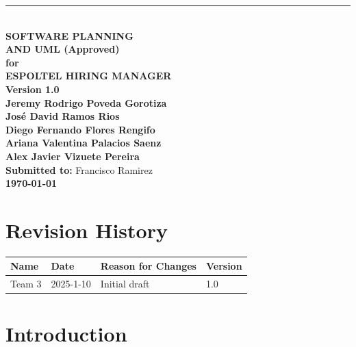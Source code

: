 \documentclass{scrreprt}
\date{November 14, 2024}
\def\myversion{1.0 }
\begin{document}
\begin{titlepage}
    \begin{flushright}
        \rule{16cm}{1.5pt} \\[1cm]
        {\Huge\bfseries SOFTWARE PLANNING\\ AND UML (Approved)}\\[1cm]
        {\LARGE\bfseries for}\\[1cm]
        {\Huge\textbf{ESPOLTEL HIRING MANAGER}}\\[2cm]
        {\Large\textbf{Version \myversion}}\\[1.5cm]
        
        {\Large\textbf{Jeremy Rodrigo Poveda Gorotiza}\\
        \textbf{José David Ramos Rios}\\
        \textbf{Diego Fernando Flores Rengifo}\\
        \textbf{Ariana Valentina Palacios Saenz}\\
        \textbf{Alex Javier Vizuete Pereira}}\\[1.5cm]
        
        {\Large\textbf{Submitted to:} Francisco Ramirez}\\[1.5cm]
        {\Large\textbf{\today}}
    \end{flushright}
    \vfill
\end{titlepage}

\chapter*{Revision History}
\setcounter{page}{1}
\begin{center}
	\begin{tabular}{@{} l l p{6.5cm} l @{}}
		\toprule
		\textbf{Name}    & \textbf{Date}   & \textbf{Reason for Changes} & \textbf{Version} \\ 
		\midrule
		Team 3           & 2025-1-10      & Initial draft               & 1.0              \\
		\bottomrule
	\end{tabular}
\end{center}

\tableofcontents

\listoffigures
\listoftables



\chapter{Introduction}
\end{document}
